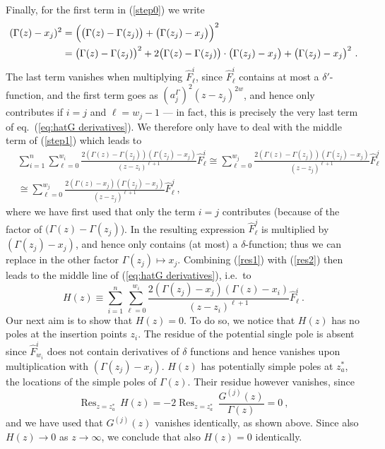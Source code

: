 \documentclass[12pt,a4paper]{article}
\newcommand{\be}{\begin{equation}}
\newcommand{\ee}{\end{equation}}
\begin{document}
Finally, for the first term in (\ref{step0}) we write 
\begin{align} \label{step1}
(\Gamma(z) - x_j)^2 & = \Bigl( \bigl(\Gamma(z) - \Gamma(z_j)\bigr) + \bigl( \Gamma(z_j) - x_j \bigr) \Bigr)^2 \\
& =  \bigl(\Gamma(z) - \Gamma(z_j)\bigr)^2 + 2 \bigl(\Gamma(z) - \Gamma(z_j)\bigr) \cdot \bigl( \Gamma(z_j) - x_j \bigr) + 
\bigl( \Gamma(z_j) - x_j \bigr)^2 \ . \nonumber
\end{align}
The last term vanishes when multiplying $\hat{F}_\ell^i$, since $\hat{F}_\ell^i$ contains at most a $\delta'$-function, and the first term goes as $(a_j^\Gamma)^2 (z-z_j)^{2w}$, and hence only contributes if $i=j$ and $\ell=w_j-1$ --- in fact, this is precisely the very last term of eq.~(\ref{eq:hatG derivatives}). We therefore only have to deal with the middle term of (\ref{step1}) which leads to 
\begin{align}
& \sum_{i=1}^{n}\sum_{\ell=0}^{w_i} \frac{2 (\Gamma(z) - \Gamma(z_j)) (\Gamma(z_j) - x_j)}{(z-z_i)^{\ell+1}} \hat{F}_\ell^i  
\cong \sum_{\ell=0}^{w_j} \frac{2 (\Gamma(z) - \Gamma(z_j)) (\Gamma(z_j)-x_j) }{(z-z_j)^{\ell+1}} \hat{F}_\ell^j    \nonumber \\ 
& \cong \sum_{\ell=0}^{w_j} \frac{2 (\Gamma(z)-x_j) (\Gamma(z_j)-x_j) }{(z-z_j)^{\ell+1}} \hat{F}_\ell^j  \ , \label{res2}
\end{align}
where we have first used that only the term $i=j$ contributes (because of the factor of $(\Gamma(z) - \Gamma(z_j)$). In the resulting expression $\hat{F}^j_\ell$ is multiplied by $(\Gamma(z_j) - x_j)$, and hence only contains (at most) a $\delta$-function; thus we can replace in the other factor $\Gamma(z_j) \mapsto x_j$. Combining (\ref{res1}) with (\ref{res2}) then leads to the middle line of (\ref{eq:hatG derivatives}), i.e.\ to 
\be 
H(z)\equiv\sum_{i=1}^n\sum_{\ell=0}^{w_i} \frac{2(\Gamma(z_j)-x_j)(\Gamma(z)-x_i)}{(z-z_i)^{\ell+1}} \hat{F}_\ell^i\ .
\ee
Our next aim is to show that $H(z) =0$. To do so, we notice that $H(z)$ has no poles at the insertion points $z_i$. The residue of the potential single pole is absent since $\hat{F}^i_{w_i}$ does not contain derivatives of $\delta$ functions and hence vanishes upon multiplication with $(\Gamma(z_j)-x_j)$. $H(z)$ has potentially simple poles at $z_a^*$, the locations of the simple poles of $\Gamma(z)$. Their residue however vanishes, since
\be 
\mathop{\text{Res}}_{z=z_{a}^*} \, H(z)= -2 \mathop{\text{Res}}_{z=z_{a}^*} \, \frac{G^{(j)}(z)}{\Gamma(z)}=0\ ,
\ee
and we have used that $G^{(j)}(z)$ vanishes identically, as shown above. Since also $H(z)\to 0$ as $z \to \infty$, we conclude that also $H(z)=0$ identically. 
\medskip
\end{document}
